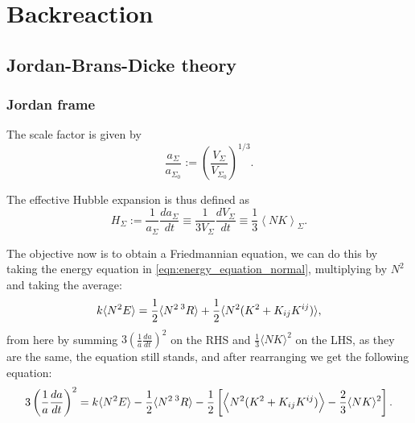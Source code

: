 \chapter{Backreaction}


\section{Jordan-Brans-Dicke theory}

\subsection{Jordan frame}

The scale factor is given by
\begin{equation}
    \frac{a_\Sigma}{a_{\Sigma_0}}:=\left(\frac{V_\Sigma}{V_{\Sigma_0}}\right)^{1/3}.
\end{equation}

The effective Hubble expansion is thus defined as
\begin{equation}
    H_{\Sigma} := \frac{1}{a_{\Sigma}}\frac{da_{\Sigma}}{dt}\equiv \frac{1}{3V_{\Sigma}}\frac{dV_{\Sigma}}{dt}\equiv\frac{1}{3}\left\langle NK \right\rangle_{\Sigma}.
    \label{eqn:def_scale_factor}
\end{equation}



The objective now is to obtain a Friedmannian equation, we can do this by taking the energy equation in \cref{eqn:energy_equation_normal}, multiplying by $N^2$ and taking the average:
\begin{equation}
    k\langle N^2E\rangle=\frac{1}{2}\langle N^2\prescript{3}{}{R}\rangle+\frac{1}{2}\langle N^2(K^2+K_{ij}K^{ij})\rangle,
\end{equation}
from here by summing $3\left(\frac{1}{a}\frac{da}{dt}\right)^2$ on the RHS and $\frac{1}{3}\langle NK\rangle^2$ on the LHS, as they are the same, the equation still stands, and after rearranging we get the following equation:
\begin{equation}
    3\left(\frac{1}{a}\frac{da}{dt}\right)^2=k\langle N^2E\rangle-\frac{1}{2}\langle N^2\prescript{3}{}{R}\rangle-\frac{1}{2}\left[\left\langle N^2(K^2+K_{ij}K^{ij})\right\rangle-\frac{2}{3}\langle NK\rangle^2\right].
\end{equation}



